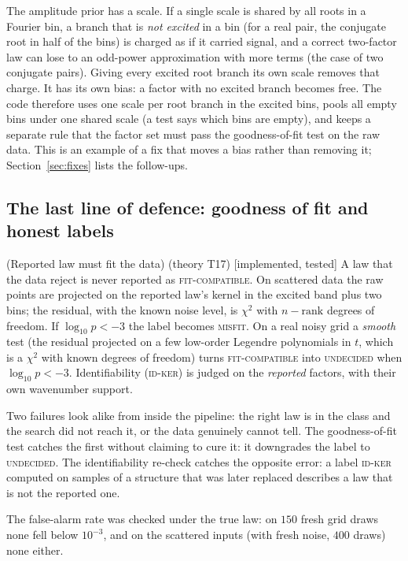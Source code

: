 \documentclass[11pt,a4paper]{article}
\theoremstyle{definition}
\newcommand{\badge}[2]{\textcolor{#1}{\textsf{\footnotesize[#2]}}}
\newcommand{\impl}{\badge{cC}{implemented, tested}}
\newcommand{\thy}[1]{\textcolor{cG}{\textsf{\footnotesize(theory #1)}}}
\begin{document}
\begin{caution}[title=Why a model comparison needs one scale per \emph{branch}]
The amplitude prior has a scale. If a single scale is shared by all roots in a Fourier bin, a branch that is \emph{not excited} in a bin (for a real pair, the conjugate root in half of the bins) is charged as if it carried signal, and a correct two-factor law can lose to an odd-power approximation with more terms (the case of two conjugate pairs). Giving every excited root branch its own scale removes that charge. It has its own bias: a factor with no excited branch becomes free. The code therefore uses one scale per root branch in the excited bins, pools all empty bins under one shared scale (a test says which bins are empty), and keeps a separate rule that the factor set must pass the goodness-of-fit test on the raw data. This is an example of a fix that moves a bias rather than removing it; Section~\ref{sec:fixes} lists the follow-ups.
\end{caution}

\subsection{The last line of defence: goodness of fit and honest labels}
\begin{theorem}{(Reported law must fit the data) \thy{T17} \impl}\label{thm:gof}
A law that the data reject is never reported as \textsc{fit-compatible}. On scattered data the raw points are projected on the reported law's kernel in the excited band plus two bins; the residual, with the known noise level, is $\chi^2$ with $n-\mathrm{rank}$ degrees of freedom. If $\log_{10}p<-3$ the label becomes \textsc{misfit}. On a real noisy grid a \emph{smooth} test (the residual projected on a few low-order Legendre polynomials in $t$, which is a $\chi^2$ with known degrees of freedom) turns \textsc{fit-compatible} into \textsc{undecided} when $\log_{10}p<-3$. Identifiability (\textsc{id-ker}) is judged on the \emph{reported} factors, with their own wavenumber support.
\end{theorem}
\begin{intuition}
Two failures look alike from inside the pipeline: the right law is in the class and the search did not reach it, or the data genuinely cannot tell. The goodness-of-fit test catches the first without claiming to cure it: it downgrades the label to \textsc{undecided}. The identifiability re-check catches the opposite error: a label \textsc{id-ker} computed on samples of a structure that was later replaced describes a law that is not the reported one.
\end{intuition}
The false-alarm rate was checked under the true law: on $150$ fresh grid draws none fell below $10^{-3}$, and on the scattered inputs (with fresh noise, $400$ draws) none either.
\end{document}
